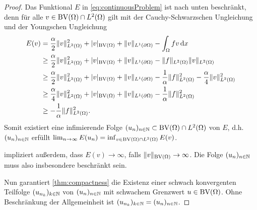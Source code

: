\begin{proof}
  Das Funktional $E$ in \eqref{eq:continuousProblem} ist nach unten beschränkt,
  denn für alle $v\in \textup{BV}(\Omega)\cap L^2(\Omega)$ gilt mit der
  Cauchy-Schwarzschen Ungleichung und der Youngschen Ungleichung
  \begin{equation}
    \label{eq:contProbBddFromBelow}
    \begin{aligned}
      E(v)&=\frac{\alpha}{2}\Vert v\Vert_{L^2(\Omega)}^2 + |v|_{\textup{BV}(\Omega)}
      +\Vert v\Vert_{L^1(\partial\Omega)}-\int_\Omega fv\,\mathrm{d}x\\
      &\geq 
      \frac{\alpha}{2}\Vert v\Vert_{L^2(\Omega)}^2 + |v|_{\textup{BV}(\Omega)}
      +\Vert v\Vert_{L^1(\partial\Omega)}
      -\Vert f\Vert_{L^2(\Omega)}\Vert v\Vert_{L^2(\Omega)}\\
      &\geq 
      \frac{\alpha}{2}\Vert v\Vert_{L^2(\Omega)}^2 + |v|_{\textup{BV}(\Omega)}
      +\Vert v\Vert_{L^1(\partial\Omega)}
      -\frac{1}{\alpha}\Vert f\Vert_{L^2(\Omega)}^2
      -\frac{\alpha}{4}\Vert v\Vert_{L^2(\Omega)}^2\\
      &\geq 
      \frac{\alpha}{4}\Vert v\Vert_{L^2(\Omega)}^2 + |v|_{\textup{BV}(\Omega)}
      +\Vert v\Vert_{L^1(\partial\Omega)}-\frac{1}{\alpha}\Vert
      f\Vert_{L^2(\Omega)}^2\\
      &\geq -\frac{1}{\alpha}\Vert f\Vert_{L^2(\Omega)}^2.
    \end{aligned}
  \end{equation}
  Somit existiert eine infimierende Folge
  $(u_n)_{n\in\mathbb{N}}\subset\textup{BV}(\Omega)\cap
  L^2(\Omega)$ von $E$, d.h.\ $(u_n)_{n\in\mathbb{N}}$ erfüllt
  $\lim_{n\rightarrow\infty}E(u_n) =
  \inf_{v\in\textup{BV}(\Omega)\cap
    L^2(\Omega)}E(v)$. 

   impliziert außerdem, dass
  $E(v)\rightarrow\infty$, falls
  $\Vert v\Vert_{\textup{BV}(\Omega)}\rightarrow\infty$.
  Die Folge $(u_n)_{n\in\mathbb{N}}$ muss also insbesondere beschränkt sein.

  \medbreak
  Nun garantiert \cref{thm:compactness} die Existenz einer schwach konvergenten
  Teilfolge $(u_{n_k})_{k\in\mathbb{N}}$ von $(u_n)_{n\in\mathbb{N}}$ mit schwachem Grenzwert
  $u\in\textup{BV}(\Omega)$. Ohne Beschränkung der Allgemeinheit
  ist $(u_{n_k})_{k\in\mathbb{N}}=(u_n)_{n\in\mathbb{N}}$.


\end{proof}
